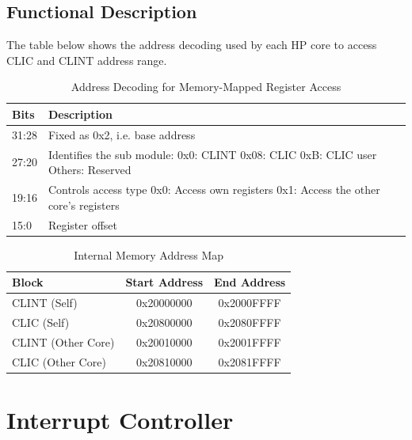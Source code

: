 \documentclass[main\_\_EN.tex]{subfiles}
\begin{document}
\subsection{Functional Description}
\label{sec:riscvcpu-tcip-func-descr}

The table below shows the address decoding used by each HP core to access CLIC and CLINT address range.

\begin{longtable}{ | l | p{5 cm} | }
\caption{Address Decoding for Memory-Mapped Register Access} \label{tab:riscvcpu-tcip-table}
\\ \hline
\rowcolor{lightgray}
Bits & Description \\ \hline
31:28 & Fixed as 0x2, i.e. base address \\ \hline
27:20 & Identifies the sub module: \newline 0x0: CLINT \newline 0x08: CLIC \newline 0xB: CLIC user \newline Others: Reserved \\ \hline
19:16 & Controls access type \newline 0x0: Access own registers \newline 0x1: Access the other core's registers\\ \hline
15:0 & Register offset \\ \hline
\end{longtable}


\begin{longtable}{ | l | c | c |}
\caption{Internal Memory Address Map} \label{tab:riscvcpu-tcip-slave-table}
\\ \hline
\rowcolor{lightgray}
Block & Start Address & End Address \\ \hline
CLINT (Self) & 0x20000000  &  0x2000FFFF\\ \hline
CLIC (Self) & 0x20800000  &  0x2080FFFF\\ \hline
CLINT (Other Core) & 0x20010000  &  0x2001FFFF\\ \hline
CLIC (Other Core) & 0x20810000  &  0x2081FFFF \\ \hline
\end{longtable}

\newpage
\section{Interrupt Controller}
\label{sec:riscvcpu-int-ctrl}
\end{document}

